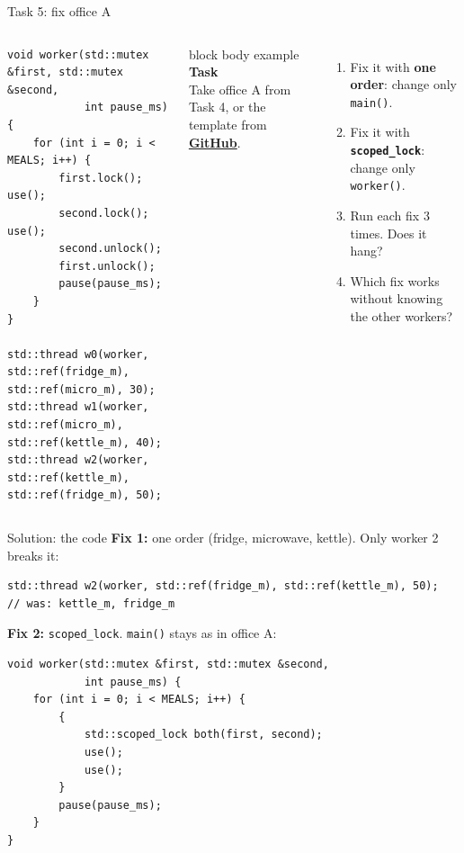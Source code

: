 \documentclass[aspectratio=169,10pt]{beamer}
\newcommand{\taskhead}[2]{%
  \begin{beamercolorbox}[rounded=true,sep=0.12cm,wd=\linewidth]{block body example}
    \small\textbf{#1}\\[0.04cm]
    \footnotesize #2
  \end{beamercolorbox}\vspace{0.1cm}}
\newcommand{\ghlink}[1]{\href{https://github.com/KsaweryM/Computer-Hardware-Course/tree/main/Lecture_7_Threads_and_Synchronisation/#1}{\textcolor{DeepBlue}{\textbf{GitHub}}}}
\begin{document}
\begin{frame}[fragile]{Task 5: fix office A}
  \begin{columns}[T,onlytextwidth]
\begin{lstlisting}[style=cpp]
void worker(std::mutex &first, std::mutex &second,
            int pause_ms) {
    for (int i = 0; i < MEALS; i++) {
        first.lock();   use();
        second.lock();  use();
        second.unlock();
        first.unlock();
        pause(pause_ms);
    }
}

std::thread w0(worker, std::ref(fridge_m), std::ref(micro_m), 30);
std::thread w1(worker, std::ref(micro_m), std::ref(kettle_m), 40);
std::thread w2(worker, std::ref(kettle_m), std::ref(fridge_m), 50);
\end{lstlisting}
      \taskhead{Task}{Take office A from Task 4, or the template from \ghlink{Task5}.}
      \scriptsize
      \begin{enumerate}\setlength{\itemsep}{4pt}
        \item Fix it with \textbf{one order}: change only \texttt{main()}.
        \item Fix it with \textbf{\texttt{scoped\_lock}}: change only \texttt{worker()}.
        \item Run each fix 3 times. Does it hang?
        \item Which fix works without knowing the other workers?
      \end{enumerate}
  \end{columns}
\end{frame}

\begin{frame}[fragile]{Solution: the code}
  {\scriptsize\textbf{Fix 1:} one order (fridge, microwave, kettle). Only worker 2 breaks it:}
\begin{lstlisting}[style=cpp]
std::thread w2(worker, std::ref(fridge_m), std::ref(kettle_m), 50);   // was: kettle_m, fridge_m
\end{lstlisting}
  {\scriptsize\textbf{Fix 2:} \texttt{scoped\_lock}. \texttt{main()} stays as in office A:\par}
  \begin{minipage}{0.6\textwidth}
\begin{lstlisting}[style=cpp]
void worker(std::mutex &first, std::mutex &second,
            int pause_ms) {
    for (int i = 0; i < MEALS; i++) {
        {
            std::scoped_lock both(first, second);
            use();
            use();
        }
        pause(pause_ms);
    }
}
\end{lstlisting}
  \end{minipage}
\end{frame}
\end{document}
